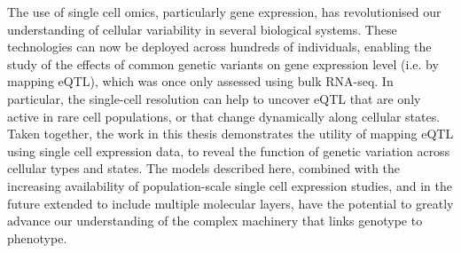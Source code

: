 The use of single cell omics, particularly gene expression, has revolutionised our understanding of cellular variability in several biological systems.
These technologies can now be deployed across hundreds of individuals, enabling the study of the effects of common genetic variants on gene expression level (i.e. by mapping eQTL), which was once only assessed using bulk RNA-seq.
In particular, the single-cell resolution can help to uncover eQTL that are only active in rare cell populations, or that change dynamically along cellular states. 
Taken together, the work in this thesis demonstrates the utility of mapping eQTL using single cell expression data, to reveal the function of genetic variation across cellular types and states.
The models described here, combined with the increasing availability of population-scale single cell expression studies, and in the future extended to include multiple molecular layers, have the potential to greatly advance our understanding of the complex machinery that links genotype to phenotype. \\









